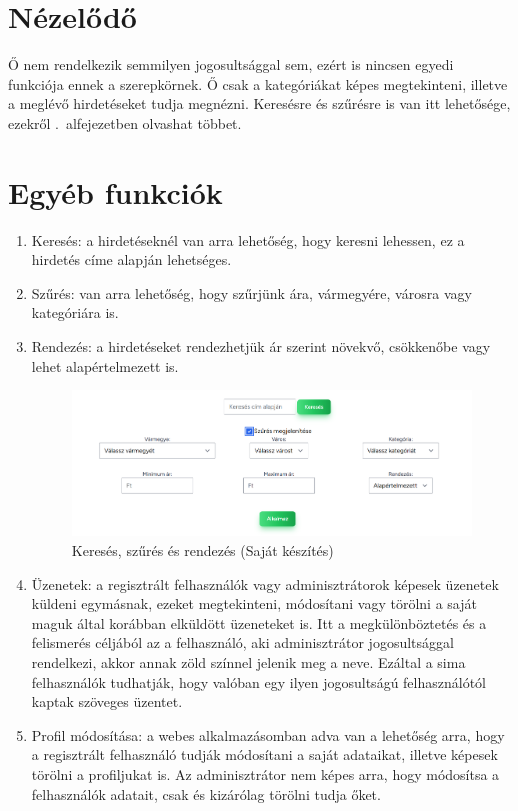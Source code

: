 \documentclass[]{thesis-ekf}
\theoremstyle{definition}
\theoremstyle{remark}
\begin{document}
	\section{Nézelődő}
		Ő nem rendelkezik semmilyen jogosultsággal sem, ezért is nincsen egyedi funkciója ennek a szerepkörnek. Ő csak a kategóriákat képes megtekinteni, illetve a meglévő hirdetéseket tudja megnézni. Keresésre és szűrésre is van itt lehetősége, ezekről .~alfejezetben olvashat többet.
	\section{Egyéb funkciók}\label{egyeb-funkciok}
		\begin{enumerate}
			\item Keresés: a hirdetéseknél van arra lehetőség, hogy keresni lehessen, ez a hirdetés címe alapján lehetséges.
			\item Szűrés: van arra lehetőség, hogy szűrjünk ára, vármegyére, városra vagy kategóriára is.
			\item Rendezés: a hirdetéseket rendezhetjük ár szerint növekvő, csökkenőbe vagy lehet alapértelmezett is.
				\begin{figure}[ht!]
				\centering
				\includegraphics[width=13cm]{./felhasznaloi/kereses-szures}
				\caption{Keresés, szűrés és rendezés (Saját készítés)} 
				\label{kereses-szures-muvelet}
			\end{figure}
			\item Üzenetek: a regisztrált felhasználók vagy adminisztrátorok képesek üzenetek küldeni egymásnak, ezeket megtekinteni, módosítani vagy törölni a saját maguk által korábban elküldött üzeneteket is. Itt a megkülönböztetés és a felismerés céljából az a felhasználó, aki adminisztrátor jogosultsággal rendelkezi, akkor annak zöld színnel jelenik meg a neve. Ezáltal a sima felhasználók tudhatják, hogy valóban egy ilyen jogosultságú felhasználótól kaptak szöveges üzentet.
			\item Profil módosítása: a webes alkalmazásomban adva van a lehetőség arra, hogy a regisztrált felhasználó tudják módosítani a saját adataikat, illetve képesek törölni a profiljukat is. Az adminisztrátor nem képes arra, hogy módosítsa a felhasználók adatait, csak és kizárólag törölni tudja őket.

\end{enumerate}
\end{document}
